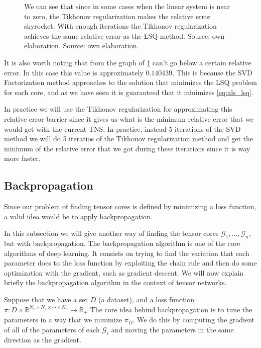 \documentclass[11pt,a4paper,openright,oneside]{book}
\numberwithin{equation}{section}
\newcommand{\figref}[1]{\cref{#1}}
\begin{document}
{\begin{figure}[H]
{    We can see that
    since in some cases when the linear system is near to zero, the Tikhonov regularization makes the relative
    error skyrocket. With enough iterations the Tikhonov regularization achieves the same
    relative error as the LSQ method. Source: own elaboration.
    Source: own elaboration.}
    \label{fig:als-convergence-tiknov}
\end{figure}
It is also worth noting that from the graph of \figref{fig:als-convergence-tiknov} can't go below
a certain relative error. In this case this value is approximately $0.140439$. This is because the SVD Factorization
method approaches to the solution that minimizes the \gls{LSQ} problem for each core, and as we have seen
it is guaranteed that it minimizes \ref{eq:als_lsq}. 

In practice we will use the Tikhonov regularization for approximating this relative error barrier since it gives us what
is the minimum relative error that we would get with the current \gls{TNS}. In practice, instead 5 iterations of the \gls{SVD} method
we will do 5 iteratios of the Tikhonov regularization method and get the minimum of the relative error that we got during these iterations
since it is way more faster.


\subsection{Backpropagation} \label{backpropagation}

Since our problem of finding tensor cores is defined by minimizing a loss function, a valid idea would be
to apply backpropagation.

In this subsection we will give another way of finding the tensor cores $\mathcal{G}_1, \dots, \mathcal{G}_n$, but with 
backpropagation. The backpropagation algorithm is one of the core algorithms of deep learning. It consists on
trying to find the variation that each parameter does to the loss function by exploiting the chain rule and
then do some optimization with the gradient, such as gradient descent. We will now explain briefly the backpropagation
algorithm in the context of tensor networks.


Suppose that we have a set $D$ (a dataset), and a loss function ${\pi: D \times \mathbb{R}^{N_1 \times N_2 \times \cdots \times N_n} \rightarrow \mathbb{R}_+}$
The core idea behind backpropagation is to tune the parameters in a way that
we minimize $\pi_D$. We do this by computing the gradient of all of the parameters of each $\mathcal{G}_i$ and moving 
the parameters in the same direction as the gradient.

}
\end{document}
